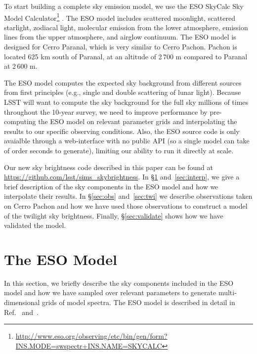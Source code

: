 \documentclass[]{spie}
\begin{document}
To start building a complete sky emission model, we use the ESO SkyCalc Sky Model Calculator\footnote{\url{http://www.eso.org/observing/etc/bin/gen/form?} \url{INS.MODE=swspectr+INS.NAME=SKYCALC}} \cite{Noll12,Jones13}.  The ESO model includes scattered moonlight, scattered starlight, zodiacal light, molecular emission from the lower atmosphere, emission lines from the upper atmosphere, and airglow continuum.  The ESO model is designed for Cerro Paranal, which is very similar to Cerro Pachon.  Pachon is located 625 km south of Paranal, at an altitude of 2\,700 m compared to Paranal at 2\,600 m.  

The ESO model computes the expected sky background from different sources from first principles (e.g., single and double scattering of lunar light). Because LSST will want to compute the sky background for the full sky millions of times throughout the 10-year survey, we need to improve performance by pre-computing the ESO model on relevant parameter grids and interpolating the results to our specific observing conditions. Also, the ESO source code is only avaialble through a web-interface with no public API (so a single model can take of order seconds to generate), limiting our ability to run it directly at scale.

Our new sky brightness code described in this paper can be found at \url{https://github.com/lsst/sims\_skybrightness}. In \S\ref{sec:eso} and~\ref{sec:interp}, we give a brief description of the sky components in the ESO model and how we interpolate their results. In \S\ref{sec:obs} and~\ref{sec:twi} we describe observations taken on Cerro Pachon and how we have used those observations to construct a model of the twilight sky brightness.  Finally, \S\ref{sec:validate} shows how we have validated the model.

\section{The ESO Model}\label{sec:eso}

In this section, we briefly describe the sky components included in the ESO model and how we have sampled over relevant parameters to generate multi-dimensional grids of model spectra. The ESO model is described in detail in Ref.~ and~.
\end{document}
